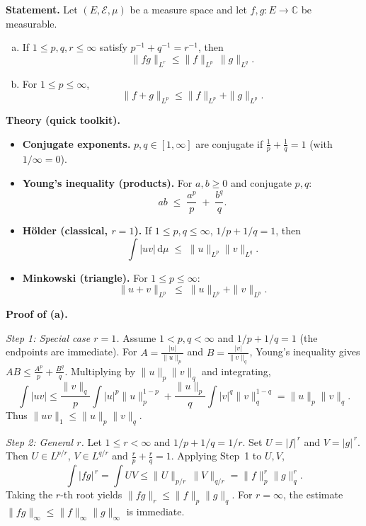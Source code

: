 \begin{problem}[CP-III-0003]
\label{prob:cp-iii-0003}
\textbf{Statement.}
Let $(E,\mathcal E,\mu)$ be a measure space and let $f,g:E\to\mathbb C$ be measurable.

\begin{enumerate}[(a)]
	\item If $1\le p,q,r\le\infty$ satisfy $p^{-1}+q^{-1}=r^{-1}$, then
	\[
	\|fg\|_{L^r}\le \|f\|_{L^p}\,\|g\|_{L^q}.
	\]
	\item For $1\le p\le\infty$,
	\[
	\|f+g\|_{L^p}\le \|f\|_{L^p}+\|g\|_{L^p}.
	\]
\end{enumerate}
\textbf{Theory (quick toolkit).}

\begin{itemize}
	\item \textbf{Conjugate exponents.} \(p,q\in[1,\infty]\) are conjugate if \(\frac1p+\frac1q=1\) (with \(1/\infty=0\)).
	\item \textbf{Young’s inequality (products).} For \(a,b\ge0\) and conjugate \(p,q\):
	\[
	ab \;\le\; \frac{a^{p}}{p} \;+\; \frac{b^{q}}{q}.
	\]
	\item \textbf{Hölder (classical, \(r=1\)).} If \(1\le p,q\le\infty\), \(1/p+1/q=1\), then
	\[
	\int |uv| \,\mathrm d\mu \;\le\; \|u\|_{L^{p}}\|v\|_{L^{q}}.
	\]
	\item \textbf{Minkowski (triangle).} For \(1\le p\le\infty\):
	\[
	\|u+v\|_{L^{p}} \;\le\; \|u\|_{L^{p}} + \|v\|_{L^{p}}.
	\]
\end{itemize}


\bigskip
\textbf{Proof of (a).}

\emph{Step 1: Special case $r=1$.}
Assume $1<p,q<\infty$ and $1/p+1/q=1$ (the endpoints are immediate).
For $A=\frac{|u|}{\|u\|_p}$ and $B=\frac{|v|}{\|v\|_q}$, Young’s inequality gives
$AB\le \frac{A^p}{p}+\frac{B^q}{q}$. Multiplying by $\|u\|_p\|v\|_q$ and integrating,
\[
\int |uv|
\le \frac{\|v\|_q}{p}\int |u|^p\|u\|_p^{1-p}
+ \frac{\|u\|_p}{q}\int |v|^q\|v\|_q^{1-q}
= \|u\|_p\|v\|_q.
\]
Thus $\|uv\|_1\le \|u\|_p\|v\|_q$.

\emph{Step 2: General $r$.}
Let $1\le r<\infty$ and $1/p+1/q=1/r$. Set $U=|f|^{\,r}$ and $V=|g|^{\,r}$.
Then $U\in L^{p/r}$, $V\in L^{q/r}$ and $\frac{r}{p}+\frac{r}{q}=1$. Applying Step~1 to $U,V$,
\[
\int |fg|^{\,r} = \int UV \le \|U\|_{p/r}\,\|V\|_{q/r}
= \|f\|_{p}^{r}\|g\|_{q}^{r}.
\]
Taking the $r$-th root yields $\|fg\|_{r}\le \|f\|_{p}\|g\|_{q}$.
For $r=\infty$, the estimate $\|fg\|_{\infty}\le \|f\|_{\infty}\|g\|_{\infty}$ is immediate.


\end{problem}
